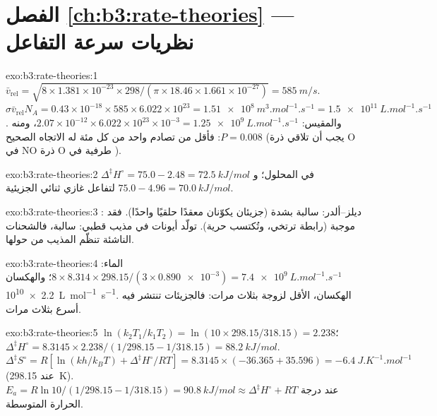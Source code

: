 \section*{الفصل \ref{ch:b3:rate-theories} --- نظريات سرعة التفاعل}

\begin{solution}{exo:b3:rate-theories:1}
$\bar v_{\mathrm{rel}} = \sqrt{8 \times 1.381\times10^{-23} \times 298/(\pi \times 18.46 \times 1.661\times10^{-27})} = \qty{585}{m/s}$.
$\sigma\bar v_{\mathrm{rel}}N_A = 0.43\times10^{-18} \times 585 \times 6.022\times10^{23} = \qty{1.51e8}{m^3.mol^{-1}.s^{-1}} =
\qty{1.5e11}{L.mol^{-1}.s^{-1}}$. والمقيس: $2.07\times10^{-12} \times 6.022\times10^{23}\times10^{-3} =
\qty{1.25e9}{L.mol^{-1}.s^{-1}}$، ومنه $P = 0.008$: فأقل من تصادم واحد من كل مئة له
الاتجاه الصحيح (يجب أن تلاقي ذرة O في NO ذرة O طرفية في ).
\end{solution}

\begin{solution}{exo:b3:rate-theories:2}
$\Delta^{\ddagger}H^\circ = 75.0 - 2.48 = \qty{72.5}{kJ/mol}$ في المحلول؛ و$75.0 - 4.96 = \qty{70.0}{kJ/mol}$
لتفاعل غازي ثنائي الجزيئية.
\end{solution}

\begin{solution}{exo:b3:rate-theories:3}
ديلز--ألدر: سالبة بشدة (جزيئان يكوّنان معقدًا حلقيًا واحدًا).
فقد : موجبة (رابطة ترتخي، وتُكتسب حرية). تولّد أيونات في
مذيب قطبي: سالبة، فالشحنات الناشئة تنظّم المذيب من حولها.
\end{solution}

\begin{solution}{exo:b3:rate-theories:4}
الماء: $8 \times 8.314 \times 298.15/(3 \times \num{0.890e-3}) = \qty{7.4e9}{L.mol^{-1}.s^{-1}}$؛ والهكسان
\qty{2.2e10}{L.mol^{-1}.s^{-1}}. الهكسان، الأقل لزوجة بثلاث مرات: فالجزيئات تنتشر فيه أسرع بثلاث
مرات.
\end{solution}

\begin{solution}{exo:b3:rate-theories:5}
$\ln(k_2T_1/k_1T_2) = \ln(10 \times 298.15/318.15) = 2.238$؛ $\Delta^{\ddagger}H^\circ = 8.3145 \times 2.238/(1/298.15 -
1/318.15) = \qty{88.2}{kJ/mol}$. $\Delta^{\ddagger}S^\circ = R[\ln(kh/k_BT) + \Delta^{\ddagger}H^\circ/RT] = 8.3145 \times
(-36.365 + 35.596) = \qty{-6.4}{J.K^{-1}.mol^{-1}}$ (عند \qty{298.15}{K}). $E_a = R\ln10/(1/298.15 - 1/318.15) =
\qty{90.8}{kJ/mol} \approx \Delta^{\ddagger}H^\circ + RT$ عند درجة الحرارة المتوسطة.
\end{solution}

